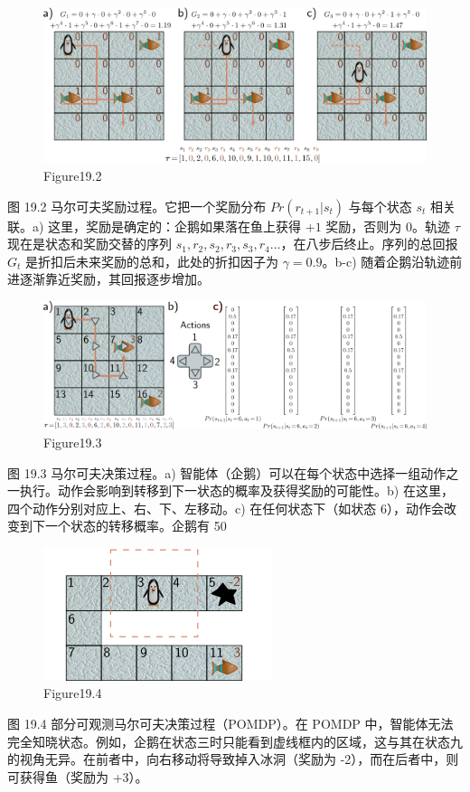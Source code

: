 \begin{figure}[ht!]
\centering
\includegraphics[width=0.7\linewidth]{png/chapter19/ReinforceMDP2.png}
\caption{Figure19.2}
\end{figure}
图 19.2 马尔可夫奖励过程。它把一个奖励分布 \(Pr(r_{t+1}|s_t)\) 与每个状态 \(s_t\) 相关联。a) 这里，奖励是确定的：企鹅如果落在鱼上获得 \(+1\) 奖励，否则为 \(0\)。轨迹 \(\tau\) 现在是状态和奖励交替的序列 \(s_1, r_2, s_2, r_3, s_3, r_4 \ldots\)，在八步后终止。序列的总回报 \(G_t\) 是折扣后未来奖励的总和，此处的折扣因子为 \(\gamma = 0.9\)。b-c) 随着企鹅沿轨迹前进逐渐靠近奖励，其回报逐步增加。

\begin{figure}[ht!]
\centering
\includegraphics[width=0.7\linewidth]{png/chapter19/ReinforceMDP3.png}
\caption{Figure19.3}
\end{figure}
图 19.3 马尔可夫决策过程。a) 智能体（企鹅）可以在每个状态中选择一组动作之一执行。动作会影响到转移到下一状态的概率及获得奖励的可能性。b) 在这里，四个动作分别对应上、右、下、左移动。c) 在任何状态下（如状态 6），动作会改变到下一个状态的转移概率。企鹅有 50%

\begin{figure}[ht!]
\centering
\includegraphics[width=0.7\linewidth]{png/chapter19/ReinforcePOMDP.png}
\caption{Figure19.4}
\end{figure}
图 19.4 部分可观测马尔可夫决策过程（POMDP）。在 POMDP 中，智能体无法完全知晓状态。例如，企鹅在状态三时只能看到虚线框内的区域，这与其在状态九的视角无异。在前者中，向右移动将导致掉入冰洞（奖励为 -2），而在后者中，则可获得鱼（奖励为 +3）。

